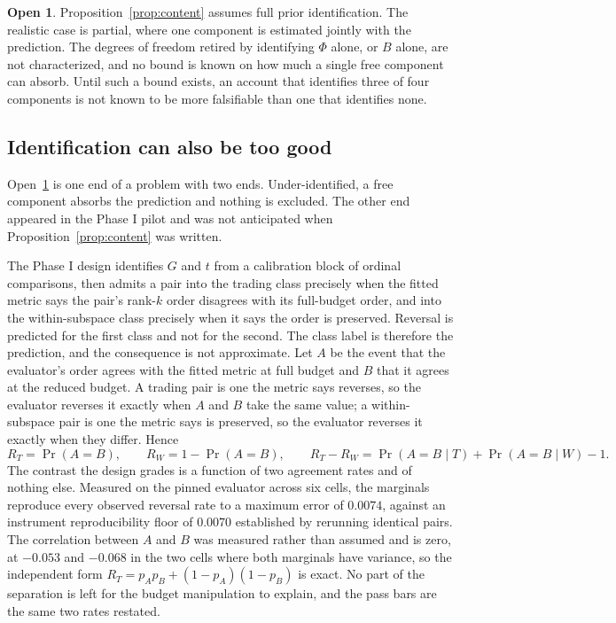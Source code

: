 \documentclass[11pt,letterpaper]{article}
\theoremstyle{plain}
\theoremstyle{definition}
\newtheorem{open}[theorem]{Open}
\begin{document}
\begin{open}
\label{open:partial}
Proposition~\ref{prop:content} assumes full prior identification. The realistic
case is partial, where one component is estimated jointly with the prediction.
The degrees of freedom retired by identifying $\Phi$ alone, or $B$ alone, are
not characterized, and no bound is known on how much a single free component can
absorb. Until such a bound exists, an account that identifies three of four
components is not known to be more falsifiable than one that identifies none.
\end{open}

\subsection*{Identification can also be too good}

Open~\ref{open:partial} is one end of a problem with two ends. Under-identified,
a free component absorbs the prediction and nothing is excluded. The other end
appeared in the Phase I pilot and was not anticipated when
Proposition~\ref{prop:content} was written.

The Phase I design identifies $G$ and $t$ from a calibration block of ordinal
comparisons, then admits a pair into the trading class precisely when the fitted
metric says the pair's rank-$k$ order disagrees with its full-budget order, and
into the within-subspace class precisely when it says the order is preserved.
Reversal is predicted for the first class and not for the second. The class
label is therefore the prediction, and the consequence is not approximate. Let
$A$ be the event that the evaluator's order agrees with the fitted metric at
full budget and $B$ that it agrees at the reduced budget. A trading pair is one
the metric says reverses, so the evaluator reverses it exactly when $A$ and $B$
take the same value; a within-subspace pair is one the metric says is preserved,
so the evaluator reverses it exactly when they differ. Hence
\[
R_T = \Pr(A = B), \qquad R_W = 1 - \Pr(A = B), \qquad
R_T - R_W = \Pr(A=B \mid T) + \Pr(A=B \mid W) - 1 .
\]
The contrast the design grades is a function of two agreement rates and of
nothing else. Measured on the pinned evaluator across six cells, the marginals
reproduce every observed reversal rate to a maximum error of $0.0074$, against
an instrument reproducibility floor of $0.0070$ established by rerunning
identical pairs. The correlation between $A$ and $B$ was measured rather than
assumed and is zero, at $-0.053$ and $-0.068$ in the two cells where both
marginals have variance, so the independent form
$R_T = p_A p_B + (1-p_A)(1-p_B)$ is exact. No part of the separation is left for
the budget manipulation to explain, and the pass bars are the same two rates
restated.
\end{document}
